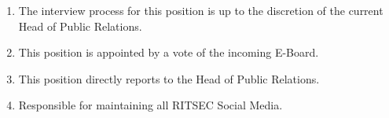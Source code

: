 
\begin{enumerate}
      \item The interview process for this position is up to the discretion of the current
            Head of Public Relations.
      \item This position is appointed by a vote of the incoming E-Board.
      \item This position directly reports to the Head of Public Relations.
      \item Responsible for maintaining all RITSEC Social Media.
\end{enumerate}